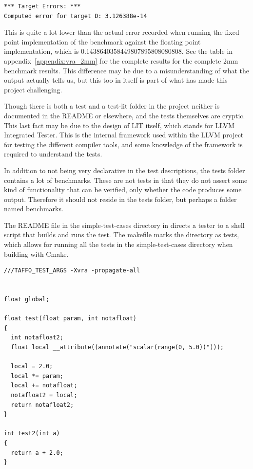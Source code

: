 \begin{lstlisting}[caption=Output of the \taffo{} error propagator for the benchmark 2mm.]
*** Target Errors: ***
Computed error for target D: 3.126388e-14
\end{lstlisting}
\label{listing:error_prop_2mm}

This is quite a lot lower than the actual error recorded when running the fixed point implementation of the benchmark against the floating point implementation, which is 0.1438640358449807895808080808. See the table in appendix~\ref{appendix:vra_2mm} for the complete results for the complete 2mm benchmark results. This difference may be due to a misunderstanding of what the output actually tells us, but this too in itself is part of what has made this project challenging.


Though there is both a test and a test-lit folder in the \taffo{} project neither is documented in the README or elsewhere, and the tests themselves are cryptic. This last fact may be due to the design of LIT itself, which stands for LLVM Integrated Tester. This is the internal framework used within the LLVM project for testing the different compiler tools, and some knowledge of the framework is required to understand the tests. 

In addition to not being very declarative in the test descriptions, the tests folder contains a lot of benchmarks. These are not tests in that they do not assert some kind of functionality that can be verified, only whether the code produces \*some\* output. Therefore it should not reside in the tests folder, but perhaps a folder named benchmarks.

The README file in the simple-test-cases directory in \taffo{} directs a tester to a shell script that builds and runs the test. The makefile marks the directory as tests, which allows for running all the tests in the simple-test-cases directory when building \taffo{} with Cmake.

\begin{lstlisting}[caption=A unit test from the \taffo{} repository]
    ///TAFFO_TEST_ARGS -Xvra -propagate-all


float global;

float test(float param, int notafloat)
{
  int notafloat2;
  float local __attribute((annotate("scalar(range(0, 5.0))")));
  
  local = 2.0;
  local *= param;
  local += notafloat;
  notafloat2 = local;
  return notafloat2;
}

int test2(int a)
{
  return a + 2.0;
}

\end{lstlisting}
\label{listing:taffo_unit_test}

